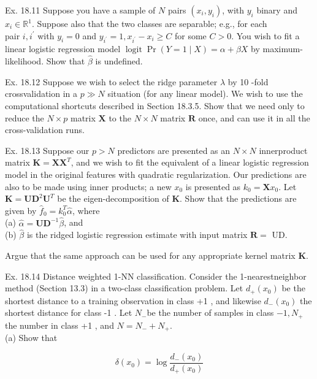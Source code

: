 \documentclass[10pt]{article}
\begin{document}
Ex. 18.11 Suppose you have a sample of $N$ pairs $\left(x_{i}, y_{i}\right)$, with $y_{i}$ binary and $x_{i} \in \mathbb{R}^{1}$. Suppose also that the two classes are separable; e.g., for each\\
pair $i, i^{\prime}$ with $y_{i}=0$ and $y_{i^{\prime}}=1, x_{i^{\prime}}-x_{i} \geq C$ for some $C>0$. You wish to fit a linear logistic regression model $\operatorname{logit} \operatorname{Pr}(Y=1 \mid X)=\alpha+\beta X$ by maximum-likelihood. Show that $\hat{\beta}$ is undefined.

Ex. 18.12 Suppose we wish to select the ridge parameter $\lambda$ by 10 -fold crossvalidation in a $p \gg N$ situation (for any linear model). We wish to use the computational shortcuts described in Section 18.3.5. Show that we need only to reduce the $N \times p$ matrix $\mathbf{X}$ to the $N \times N$ matrix $\mathbf{R}$ once, and can use it in all the cross-validation runs.

Ex. 18.13 Suppose our $p>N$ predictors are presented as an $N \times N$ innerproduct matrix $\mathbf{K}=\mathbf{X} \mathbf{X}^{T}$, and we wish to fit the equivalent of a linear logistic regression model in the original features with quadratic regularization. Our predictions are also to be made using inner products; a new $x_{0}$ is presented as $k_{0}=\mathbf{X} x_{0}$. Let $\mathbf{K}=\mathbf{U D}^{2} \mathbf{U}^{T}$ be the eigen-decomposition of $\mathbf{K}$. Show that the predictions are given by $\hat{f}_{0}=k_{0}^{T} \hat{\alpha}$, where\\
(a) $\hat{\alpha}=\mathbf{U D}^{-1} \hat{\beta}$, and\\
(b) $\hat{\beta}$ is the ridged logistic regression estimate with input matrix $\mathbf{R}=$ UD.

Argue that the same approach can be used for any appropriate kernel matrix $\mathbf{K}$.

Ex. 18.14 Distance weighted 1-NN classification. Consider the 1-nearestneighbor method (Section 13.3) in a two-class classification problem. Let $d_{+}\left(x_{0}\right)$ be the shortest distance to a training observation in class +1 , and likewise $d_{-}\left(x_{0}\right)$ the shortest distance for class -1 . Let $N_{-}$be the number of samples in class $-1, N_{+}$the number in class +1 , and $N=N_{-}+N_{+}$.\\
(a) Show that


\begin{equation*}
\delta\left(x_{0}\right)=\log \frac{d_{-}\left(x_{0}\right)}{d_{+}\left(x_{0}\right)} \tag{18.57}
\end{equation*}
\end{document}
